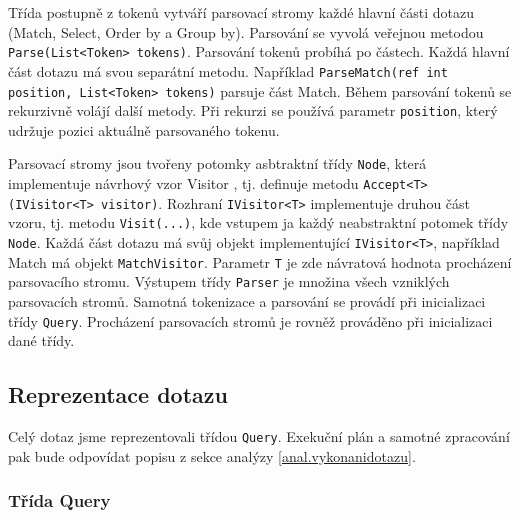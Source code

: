 Třída postupně z tokenů vytváří parsovací stromy každé hlavní části dotazu (Match, Select, Order by a Group by).
Parsování se vyvolá veřejnou metodou \texttt{Parse(List<Token> tokens)}.
Parsování tokenů probíhá po částech.
Každá hlavní část dotazu má svou separátní metodu.
Například \texttt{ParseMatch(ref int position, List<Token> tokens)} parsuje část Match. 
Během parsování tokenů se rekurzivně volájí další metody.
Při rekurzi se používá parametr \texttt{position}, který udržuje pozici aktuálně parsovaného tokenu.

Parsovací stromy jsou tvořeny potomky asbtraktní třídy \texttt{Node}, která implementuje návrhový vzor Visitor \citep[str. 331]{patterns}, tj. definuje metodu \texttt{Accept<T>(IVisitor<T> visitor)}.
Rozhraní \texttt{IVisitor<T>} implementuje druhou část vzoru, tj. metodu \texttt{Visit(...)}, kde vstupem ja každý neabstraktní potomek třídy \texttt{Node}.
Každá část dotazu má svůj objekt implementující \texttt{IVisitor<T>}, například Match má objekt \texttt{MatchVisitor}.
Parametr \texttt{T} je zde návratová hodnota procházení parsovacího stromu.
Výstupem třídy \texttt{Parser} je množina všech vzniklých parsovacích stromů.
Samotná tokenizace a parsování se provádí při inicializaci třídy \texttt{Query}.
Procházení parsovacích stromů je rovněž prováděno při inicializaci dané třídy.

\subsection{Reprezentace dotazu}
Celý dotaz jsme reprezentovali třídou \texttt{Query}.
Exekuční plán a samotné zpracování pak bude odpovídat popisu z sekce analýzy \ref{anal.vykonanidotazu}.

\subsubsection{Třída Query}

